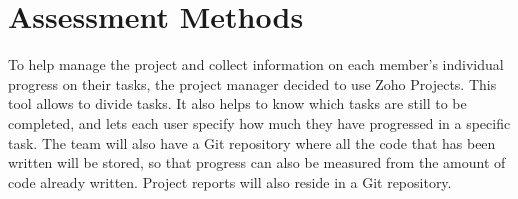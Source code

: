 \section{Assessment Methods}

To help manage the project and collect information on each member's individual progress on their tasks, the project manager decided to use Zoho Projects. This tool allows to divide tasks.  It also helps to know which tasks are still to be completed, and lets each user specify how much they have progressed in a specific task. The team will also have a Git repository where all the code that has been written will be stored, so that progress can also be measured from the amount of code already written. Project reports will also reside in a Git repository.